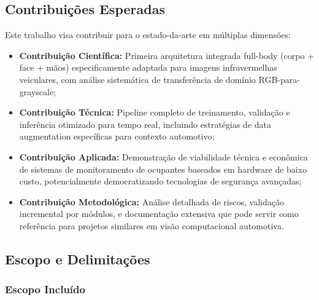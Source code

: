 \documentclass[12pt, a4paper]{article}
\begin{document}
\subsection{Contribuições Esperadas}

Este trabalho visa contribuir para o estado-da-arte em múltiplas dimensões:

\begin{itemize}
    \item \textbf{Contribuição Científica:} Primeira arquitetura integrada full-body (corpo + face + mãos) especificamente adaptada para imagens infravermelhas veiculares, com análise sistemática de transferência de domínio RGB-para-grayscale;
    
    \item \textbf{Contribuição Técnica:} Pipeline completo de treinamento, validação e inferência otimizado para tempo real, incluindo estratégias de data augmentation específicas para contexto automotivo;
    
    \item \textbf{Contribuição Aplicada:} Demonstração de viabilidade técnica e econômica de sistemas de monitoramento de ocupantes baseados em hardware de baixo custo, potencialmente democratizando tecnologias de segurança avançadas;
    
    \item \textbf{Contribuição Metodológica:} Análise detalhada de riscos, validação incremental por módulos, e documentação extensiva que pode servir como referência para projetos similares em visão computacional automotiva.
\end{itemize}

\subsection{Escopo e Delimitações}

\subsubsection{Escopo Incluído}
\end{document}

